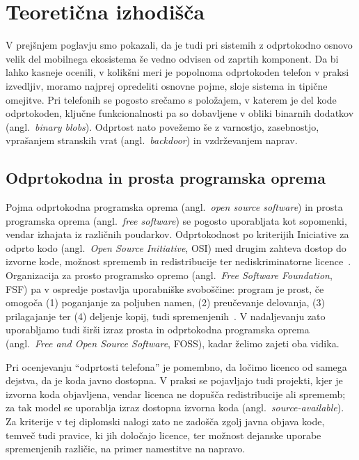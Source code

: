 \documentclass[a4paper,12pt,openright]{book}
\begin{document}
\chapter{Teoretična izhodišča}
\label{chap:teoreticna_izhodisca}

V prejšnjem poglavju smo pokazali, da je tudi pri sistemih z odprtokodno osnovo velik del mobilnega ekosistema še vedno odvisen od zaprtih komponent.
Da bi lahko kasneje ocenili, v kolikšni meri je popolnoma odprtokoden telefon v praksi izvedljiv, moramo najprej opredeliti osnovne pojme, sloje sistema in tipične omejitve.
Pri telefonih se pogosto srečamo s položajem, v katerem je del kode odprtokoden, ključne funkcionalnosti pa so dobavljene v obliki binarnih dodatkov (angl.~\textit{binary blobs}).
Odprtost nato povežemo še z varnostjo, zasebnostjo, vprašanjem stranskih vrat (angl.~\textit{backdoor}) in vzdrževanjem naprav.

\section{Odprtokodna in prosta programska oprema}
\label{sec:teorija_foss}

Pojma odprtokodna programska oprema (angl.~\textit{open source software}) in prosta programska oprema (angl.~\textit{free software}) se pogosto uporabljata kot sopomenki, vendar izhajata iz različnih poudarkov.
Odprtokodnost po kriterijih Iniciative za odprto kodo (angl.~\textit{Open Source Initiative}, OSI) med drugim zahteva dostop do izvorne kode, možnost sprememb in redistribucije ter nediskriminatorne licence~\cite{osi_osd}.
Organizacija za prosto programsko opremo (angl.~\textit{Free Software Foundation}, FSF) pa v ospredje postavlja uporabniške svoboščine: program je prost, če omogoča (1) poganjanje za poljuben namen, (2) preučevanje delovanja, (3) prilagajanje ter (4) deljenje kopij, tudi spremenjenih~\cite{fsf_free_software}.
V nadaljevanju zato uporabljamo tudi širši izraz prosta in odprtokodna programska oprema (angl.~\textit{Free and Open Source Software}, FOSS), kadar želimo zajeti oba vidika.

Pri ocenjevanju \enquote{odprtosti telefona} je pomembno, da ločimo licenco od samega dejstva, da je koda javno dostopna.
V praksi se pojavljajo tudi projekti, kjer je izvorna koda objavljena, vendar licenca ne dopušča redistribucije ali sprememb; za tak model se uporablja izraz dostopna izvorna koda (angl.~\textit{source-available}).
Za kriterije v tej diplomski nalogi zato ne zadošča zgolj javna objava kode, temveč tudi pravice, ki jih določajo licence, ter možnost dejanske uporabe spremenjenih različic, na primer namestitve na napravo.
\end{document}
